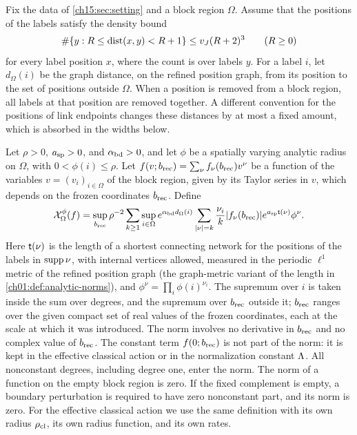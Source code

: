\begin{definition}\label{ch15:def:regional-norm}
Fix the data of \cref{ch15:sec:setting} and a block region $\Omega$. Assume that the positions of the labels satisfy the density bound
\begin{equation}\label{ch15:eq:label-density}
 \#\{y:R\le\operatorname{dist}(x,y)<R+1\}\le v_J(R+2)^3\qquad(R\ge0)
\end{equation}
for every label position $x$, where the count is over labels $y$. For a label $i$, let $d_\Omega(i)$ be the graph distance, on the refined position graph, from its position to the set of positions outside $\Omega$. When a position is removed from a block region, all labels at that position are removed together. A different convention for the positions of link endpoints changes these distances by at most a fixed amount, which is absorbed in the widths below.

Let $\rho>0$, $a_{\mathrm{sp}}>0$, and $\alpha_{\mathrm{bd}}>0$, and let $\phi$ be a spatially varying analytic radius on $\Omega$, with $0<\phi(i)\le\rho$. Let $f(v;b_{\mathrm{rec}})=\sum_\nu f_\nu(b_{\mathrm{rec}})v^\nu$ be a function of the variables $v=(v_i)_{i\in\Omega}$ of the block region, given by its Taylor series in $v$, which depends on the frozen coordinates $b_{\mathrm{rec}}$. Define
\[
 \mathcal X_\Omega^\phi(f)=
 \sup_{b_{\mathrm{rec}}}\rho^{-2}
 \sum_{k\ge1}\sup_{i\in\Omega}e^{\alpha_{\mathrm{bd}} d_\Omega(i)}
 \sum_{|\nu|=k}\frac{\nu_i}{k}|f_\nu(b_{\mathrm{rec}})|
                 e^{a_{\mathrm{sp}}\mathsf t(\nu)}\phi^\nu .
\]
Here $\mathsf t(\nu)$ is the length of a shortest connecting network for the positions of the labels in $\operatorname{supp}\nu$, with internal vertices allowed, measured in the periodic $\ell^1$ metric of the refined position graph (the graph-metric variant of the length in \cref{ch01:def:analytic-norms}), and $\phi^\nu=\prod_i\phi(i)^{\nu_i}$. The supremum over $i$ is taken inside the sum over degrees, and the supremum over $b_{\mathrm{rec}}$ outside it; $b_{\mathrm{rec}}$ ranges over the given compact set of real values of the frozen coordinates, each at the scale at which it was introduced. The norm involves no derivative in $b_{\mathrm{rec}}$ and no complex value of $b_{\mathrm{rec}}$. The constant term $f(0;b_{\mathrm{rec}})$ is not part of the norm: it is kept in the effective classical action or in the normalization constant $\Lambda$. All nonconstant degrees, including degree one, enter the norm. The norm of a function on the empty block region is zero. If the fixed complement is empty, a boundary perturbation is required to have zero nonconstant part, and its norm is zero. For the effective classical action we use the same definition with its own radius $\rho_{\mathrm{cl}}$, its own radius function, and its own rates.


\end{definition}
